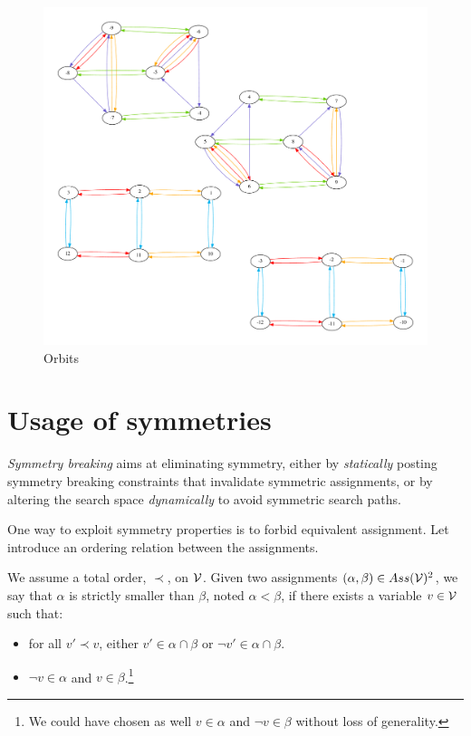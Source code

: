  \begin{figure}[h]
 	\centering
 		\includegraphics[width=\textwidth]{cnfs/orbits}
 	\caption{Orbits}
 	\label{fig:orbits}
 \end{figure}



\section{Usage of symmetries}

\emph{Symmetry breaking} aims at eliminating symmetry, either
by \emph{statically} posting symmetry breaking constraints that invalidate symmetric
assignments, or by altering the search space \emph{dynamically} to avoid symmetric search paths.


One way to exploit symmetry properties is to forbid equivalent assignment.
Let introduce an ordering relation between the assignments.

\begin{definition}
	\label{def:assignment_ordering}
	We assume a total order, $\prec$, on $\mathcal{V}$.  Given two assignments $(\alpha,\beta) \in Ass(\mathcal{V})^2 $, 
	we say that $\alpha$ is strictly smaller than $\beta$, noted $\alpha < \beta$, if there exists a variable $v \in \mathcal{V}$
	such that:
	\begin{itemize}
		\item for all $v' \prec v$, either $v' \in \alpha \cap \beta$ or $\neg v' \in \alpha \cap
		\beta$.
		\item $\neg v \in \alpha$ and $v \in \beta$.\footnote{We could have chosen as well $v \in \alpha$ and $\neg v \in \beta$ without loss of generality.}
	\end{itemize}
\end{definition}

